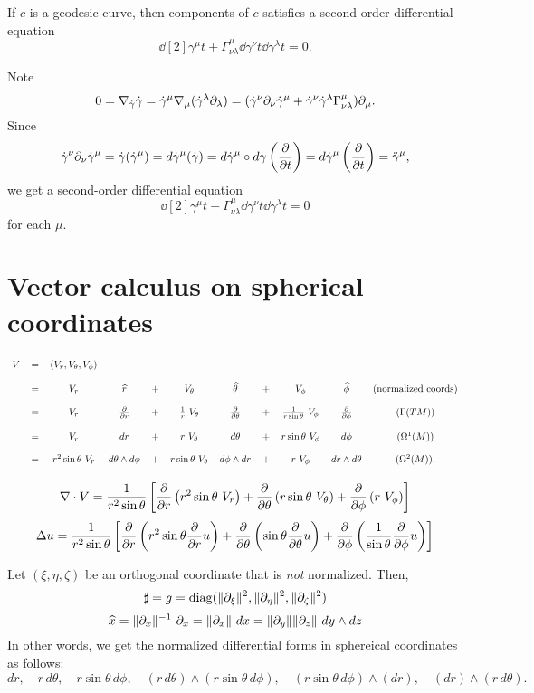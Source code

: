 \documentclass[12pt]{article}
\begin{document}
\begin{thm}
If $c$ is a geodesic curve, then components of $c$ satisfies a second-order differential equation
\[\dd[2]{\gamma^\mu}{t}+\Gamma_{\nu\lambda}^\mu\dd{\gamma^\nu}{t}\dd{\gamma^\lambda}{t}=0.\]
\end{thm}
\begin{pf}
Note
\[0=\nabla_{\dot\gamma}\dot\gamma=\dot\gamma^\mu\nabla_\mu(\dot\gamma^\lambda\pd_\lambda)
=(\dot\gamma^\nu\pd_\nu\dot\gamma^\mu+\dot\gamma^\nu\dot\gamma^\lambda\Gamma_{\nu\lambda}^\mu)\pd_\mu.\]
Since
\[\dot\gamma^\nu\pd_\nu\dot\gamma^\mu=\dot\gamma(\dot\gamma^\mu)=d\dot\gamma^\mu(\dot\gamma)=d\dot\gamma^\mu\circ d\gamma\left(\pd{t}\right)=d\dot\gamma^\mu\left(\pd{t}\right)=\ddot\gamma^\mu,\]
we get a second-order differential equation
\[\dd[2]{\gamma^\mu}{t}+\Gamma_{\nu\lambda}^\mu\dd{\gamma^\nu}{t}\dd{\gamma^\lambda}{t}=0\]
for each $\mu$.
\end{pf}


\section{Vector calculus on spherical coordinates}
\[
\begin{tikzcd}[row sep=5pt, column sep=3pt]
V&=&(V_r,V_\theta,V_\phi)&&&&&&&&\\
&=&V_r&\hat{r}&+&V_\theta&\hat{\theta}&+&V_\phi&\hat{\phi}&(\text{normalized coords})\\
&=&V_r&\pd{r}&+&\frac1r\ V_\theta&\pd{\theta}&+&\frac1{r\sin\theta}\ V_\phi&\pd{\phi}&(\Gamma(TM))\\
&=&V_r&dr&+&r\ V_\theta&d\theta&+&r\sin\theta\ V_\phi&d\phi&(\Omega^1(M))\\
&=&r^2\sin\theta\ V_r&d\theta\wedge d\phi&+&r\sin\theta\ V_\theta&d\phi\wedge dr&+&r\ V_\phi&dr\wedge d\theta&(\Omega^2(M)).
\end{tikzcd}
\]

\[
\nabla\cdot V=\frac1{r^2\sin\theta}\left[  \pd{r}\left(r^2\sin\theta\ V_r\right) + \pd{\theta}\left(r\sin\theta\ V_\theta\right) + \pd{\phi}\left(r\ V_\phi\right)  \right]
\]
\[\Delta u=\frac1{r^2\sin\theta}\left[\pd{r}\left(r^2\sin\theta\pd{r}u\right)+\pd{\theta}\left(\sin\theta\pd{\theta}u\right)+\pd{\phi}\left(\frac1{\sin\theta}\pd{\phi}u\right)\right]\]

Let $(\xi,\eta,\zeta)$ be an orthogonal coordinate that is \emph{not} normalized.
Then,
\[\sharp=g=\diag(\|\pd_\xi\|^2,\|\pd_\eta\|^2,\|\pd_\zeta\|^2)\]
\[\hat x=\|\pd_x\|^{-1}\ \pd_x=\|\pd_x\|\ dx=\|\pd_y\|\|\pd_z\|\ dy\wedge dz\]
In other words, we get the normalized differential forms in sphereical coordinates as follows:
\[dr,\quad r\,d\theta,\quad r\sin\theta\,d\phi,\quad(r\,d\theta)\wedge(r\sin\theta\,d\phi),\quad(r\sin\theta\,d\phi)\wedge(dr),\quad(dr)\wedge(r\,d\theta).\]
\end{document}
